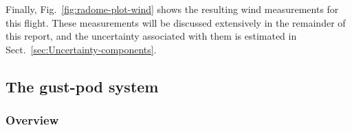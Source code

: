 \documentclass[12pt,twoside,english]{article}\usepackage[]{graphicx}\usepackage[]{color}
\let\OrgIndex\index
\renewcommand*{\index}[1]{\OrgIndex{#1}}
\begin{document}
{Finally, Fig.~\ref{fig:radome-plot-wind}  shows the resulting wind measurements for this flight. These measurements will be discussed extensively in the remainder of this report, and the uncertainty associated with them is estimated in Sect.~\ref{sec:Uncertainty-components}. 

\subsection{The gust-pod system\label{sub:The-gust-pod-system}}


\subsubsection{Overview}

}
\end{document}
